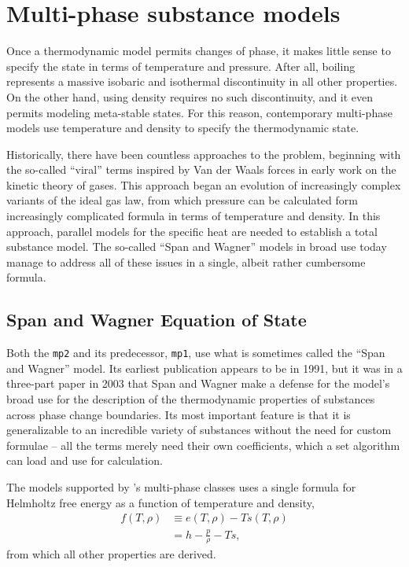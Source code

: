 \chapter{Multi-phase substance models}\label{ch:mp}

Once a thermodynamic model permits changes of phase, it makes little sense to specify the state in terms of temperature and pressure.  After all, boiling represents a massive isobaric and isothermal discontinuity in all other properties.  On the other hand, using density requires no such discontinuity, and it even permits modeling meta-stable states.  For this reason, contemporary multi-phase models use temperature and density to specify the thermodynamic state.

Historically, there have been countless approaches to the problem, beginning with the so-called ``viral'' terms inspired by Van der Waals forces in early work on the kinetic theory of gases.  This approach began an evolution of increasingly complex variants of the ideal gas law, from which pressure can be calculated form increasingly complicated formula in terms of temperature and density.  In this approach, parallel models for the specific heat are needed to establish a total substance model.  The so-called ``Span and Wagner'' models in broad use today manage to address all of these issues in a single, albeit rather cumbersome formula.

\section{Span and Wagner Equation of State}\label{sec:mp:sweos}

Both the \texttt{mp2} and its predecessor, \texttt{mp1}, use what is sometimes called the ``Span and Wagner'' model.  Its earliest publication appears to be in 1991\cite{stewart:1991, setzmann:1991}, but it was in a three-part paper in 2003 that Span and Wagner make a defense for the model's broad use for the description of the thermodynamic properties of substances across phase change boundaries\cite{span:2003:1, span:2003:2, span:2003:3}. Its most important feature is that it is generalizable to an incredible variety of substances without the need for custom formulae -- all the terms merely need their own coefficients, which a set algorithm can load and use for calculation.  

The models supported by \PM's multi-phase classes uses a single formula for Helmholtz free energy as a function of temperature and density,
\begin{align}
f(T,\rho) &\equiv e(T,\rho) - T s(T,\rho)\\
 &= h - \frac{p}{\rho} - T s,
\end{align}
from which all other properties are derived.

